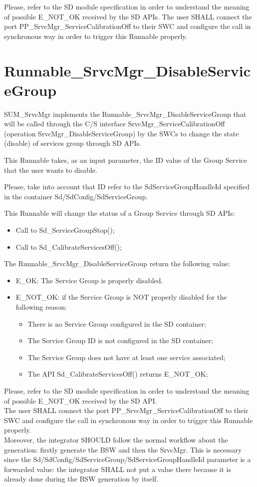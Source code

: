 Please, refer to the SD module specification in order to understand the meaning of possible E\_NOT\_OK received by the SD APIs. 
The user SHALL connect the port PP\_SrvcMgr\_ServiceCalibrationOff to their SWC and configure the call in synchronous way in order to trigger this Runnable properly.

\section{Runnable\_SrvcMgr\_DisableServiceGroup}
SUM\_SrvcMgr implements the Runnable\_SrvcMgr\_DisableServiceGroup that will be called through the C/S interface SrvcMgr\_ServiceCalibrationOff (operation SrvcMgr\_DisableServiceGroup) 
by the SWCs to change the state (disable) of services group through SD APIs.

This Runnable takes, as an input parameter, the ID value of the Group Service that the user wants to disable. 

Please, take into account that ID refer to the SdServiceGroupHandleId specified in the container Sd/SdConfig/SdServiceGroup.

This Runnable will change the status of a Group Service through SD APIs:

\begin{itemize}
\item Call to Sd\_ServiceGroupStop();
\item Call to Sd\_CalibrateServicesOff();
\end{itemize}

The Runnable\_SrvcMgr\_DisableServiceGroup return the following value: 
\begin{itemize}
\item E\_OK: The Service Group is properly disabled.
\item E\_NOT\_OK: if the Service Group is NOT properly disabled for the following reason:
\begin{itemize}
\item There is no Service Group configured in the SD container; 
\item The Service Group ID is not configured in the SD container; 
\item The Service Group does not have at least one service associated; 
\item The API Sd\_CalibrateServicesOff() returns E\_NOT\_OK;
\end{itemize}
\end{itemize}

Please, refer to the SD module specification in order to understand the meaning of possible E\_NOT\_OK received by the SD API.\\
The user SHALL connect the port PP\_SrvcMgr\_ServiceCalibrationOff to their SWC and configure the call in synchronous way in order to trigger this Runnable properly.\\
Moreover, the integrator SHOULD follow the normal workflow about the generation: firstly generate the BSW and then the SrvcMgr. This is necessary since the Sd/SdConfig/SdServiceGroup/SdServiceGroupHandleId parameter
is a forwarded value: the integrator SHALL not put a value there because it is already done during the BSW generation by itself. 